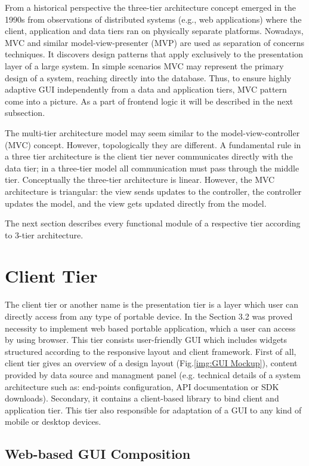    From a historical perspective the three-tier architecture concept emerged in the 1990s from observations of distributed systems\cite{wiki:3tier} (e.g., web applications) where the client, application and data tiers ran on physically separate platforms. Nowadays, MVC and similar model-view-presenter (MVP) are used as separation of concerns techniques. It discovers design patterns that apply exclusively to the presentation layer of a large system. In simple scenarios MVC may represent the primary design of a system, reaching directly into the database. Thus, to ensure highly adaptive GUI independently from a data and application tiers, MVC pattern come into a picture. As a part of frontend logic it will be described in the next subsection.
  
  The multi-tier architecture model may seem similar to the model-view-controller (MVC) concept. However, topologically they are different. A fundamental rule in a three tier architecture is the client tier never communicates directly with the data tier; in a three-tier model all communication must pass through the middle tier. Conceptually the three-tier architecture is linear. However, the MVC architecture is triangular: the view sends updates to the controller, the controller updates the model, and the view gets updated directly from the model.

  The next section describes every functional module of a respective tier according to 3-tier architecture.

\section{Client Tier}
  The client tier or another name is the presentation tier is a layer which user can directly access from any type of portable device. In the Section 3.2 was proved necessity to implement web based portable application, which a user can access by using browser. This tier consists user-friendly GUI which includes widgets structured according to the responsive layout and client framework. First of all, client tier gives an overview of a design layout (Fig.\ref{img:GUI Mockup}), content provided by data source and managment panel (e.g. technical details of a system architecture such as: end-points configuration, API documentation or SDK downloads). Secondary, it contains a client-based library to bind client and application tier. This tier also responsible for adaptation of a GUI to any kind of mobile or desktop devices. 
  \subsection{Web-based GUI Composition}


